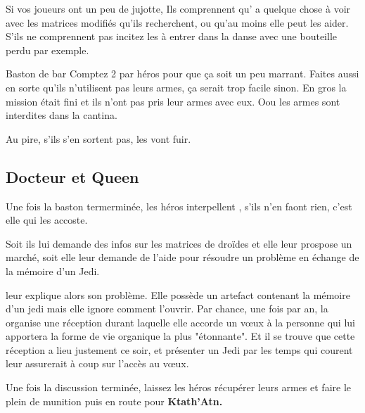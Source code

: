 Si vos joueurs ont un peu de jujotte, Ils comprennent qu’ a quelque chose à voir avec les matrices modifiés qu’ils recherchent, ou qu’au moins elle peut les aider. S’ils ne comprennent pas incitez les à entrer dans la danse avec une bouteille perdu par exemple.

\begin{paperbox}{Baston de bar}
Comptez 2  par héros pour que ça soit un peu marrant. Faites aussi en sorte qu’ils n’utilisent pas leurs armes, ça serait trop facile sinon. En gros la mission était fini et ils n’ont pas pris leur armes avec eux. Oou les armes sont interdites dans la cantina.

Au pire, s’ils s’en sortent pas, les  vont fuir.
\end{paperbox}

\subsection{Docteur et Queen}

Une fois la baston termerminée, les héros interpellent , s’ils n’en faont rien, c’est elle qui les accoste.

Soit ils lui demande des infos sur les matrices de droïdes et elle leur prospose un marché, soit elle leur demande de l’aide pour résoudre un problème en échange de la mémoire d’un Jedi.

 leur explique alors son problème. Elle possède un artefact contenant la mémoire d’un jedi mais elle ignore comment l’ouvrir. Par chance, une fois par an, la  organise une réception durant laquelle elle accorde un vœux à la personne qui lui apportera la forme de vie organique la plus "étonnante". Et il se trouve que cette réception a lieu justement ce soir, et présenter un Jedi par les temps qui courent leur assurerait à coup sur l’accès au vœux.

\bigbreak

Une fois la discussion terminée, laissez les héros récupérer leurs armes et faire le plein de munition puis en route pour \textbf{Ktath’Atn.}
